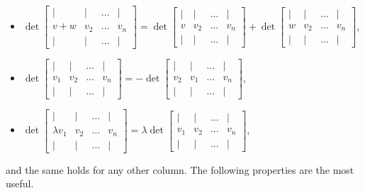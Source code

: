 \documentclass[12pt]{article}
\theoremstyle{breakplain}
\theoremstyle{breakdef}
\theoremstyle{remark}
\begin{document}
\begin{itemize}
    \item $\det\begin{bmatrix}
        \vert& \vert& \ldots & \vert\\
        v+w& v_2 &\ldots & v_n\\
        \vert& \vert& \ldots &\vert
    \end{bmatrix} = \det\begin{bmatrix}
        \vert& \vert& \ldots &\vert\\
        v& v_2 &\ldots & v_n\\
        \vert& \vert& \ldots &\vert
    \end{bmatrix} +\det\begin{bmatrix}
        \vert& \vert& \ldots &\vert\\
        w& v_2 &\ldots & v_n\\
        \vert& \vert& \ldots &\vert
    \end{bmatrix}$,
    \item $\det\begin{bmatrix}
        \vert &\vert &\ldots &\vert\\
        v_1& v_2 &\ldots & v_n\\
        \vert &\vert &\ldots &\vert
    \end{bmatrix} = -\det\begin{bmatrix}
        \vert&\vert & \ldots &\vert\\
        v_2& v_1 &\ldots & v_n\\
        \vert&\vert &\ldots &\vert
    \end{bmatrix}$,
    \item $\det\begin{bmatrix}
        \vert& \vert& \ldots & \vert\\
        \lambda v_1& v_2 & \ldots & v_n\\
        \vert& \vert& \ldots & \vert
    \end{bmatrix} = \lambda\det\begin{bmatrix}
        \vert& \vert& \ldots & \vert\\
        v_1& v_2 & \ldots & v_n\\
        \vert& \vert& \ldots & \vert
    \end{bmatrix}$,
\end{itemize}
and the same holds for any other column.
The following properties are the most useful.
\end{document}
